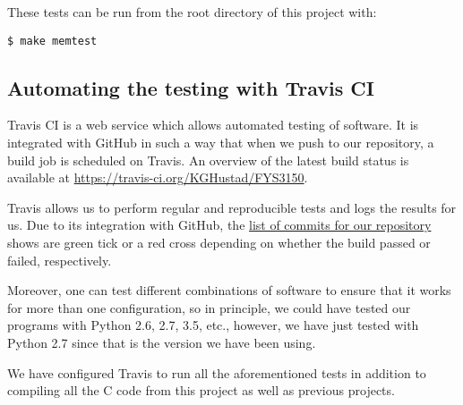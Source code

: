 These tests can be run from the root directory of this project with:

\begin{verbatim}
$ make memtest
\end{verbatim}

\subsection{Automating the testing with Travis CI}
\label{appx:testing:travis}
Travis CI is a web service which allows automated testing of software. It is integrated with GitHub in such a way that when we push to our repository, a build job is scheduled on Travis. An overview of the latest build status is available at \url{https://travis-ci.org/KGHustad/FYS3150}.

Travis allows us to perform regular and reproducible tests and logs the results for us. Due to its integration with GitHub, the \href{https://github.com/KGHustad/FYS3150/commits/master}{list of commits for our repository} shows are green tick or a red cross depending on whether the build passed or failed, respectively.

Moreover, one can test different combinations of software to ensure that it works for more than one configuration, so in principle, we could have tested our programs with Python 2.6, 2.7, 3.5, etc., however, we have just tested with Python 2.7 since that is the version we have been using.

We have configured Travis to run all the aforementioned tests in addition to compiling all the C code from this project as well as previous projects.
